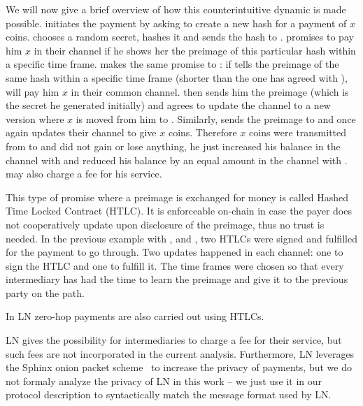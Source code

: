     We will now give a brief overview of how this counterintuitive dynamic
    is made possible. \alice{} initiates the payment by asking \charlie{} to
    create a new hash for a payment of $x$ coins. \charlie{} chooses a random
    secret, hashes it and sends the hash to \alice. \alice{} promises \bob{} to
    pay him $x$ in their channel if he shows her the preimage of this particular
    hash within a specific time frame. \bob{} makes the same promise to
    \charlie{}: if \charlie{} tells \bob{} the preimage of the same hash within
    a specific time frame (shorter than the one \bob{} has agreed with
    \alice{}), \bob{} will pay him $x$ in their common channel. \charlie{} then
    sends him the preimage (which is the secret he generated initially) and
    \bob{} agrees to update the channel to a new version where $x$ is moved from
    him to \charlie. Similarly, \bob{} sends the preimage to \alice{} and once
    again \alice{} updates their channel to give \bob{} $x$ coins. Therefore $x$
    coins were transmitted from \alice{} to \charlie{} and \bob{} did not gain
    or lose anything, he just increased his balance in the channel with \alice{}
    and reduced his balance by an equal amount in the channel with \charlie.
    \bob{} may also charge a fee for his service.

    This type of promise where a preimage is exchanged for money is called
    Hashed Time Locked Contract (HTLC). It is enforceable on-chain in case the
    payer does not cooperatively update upon disclosure of the preimage, thus no
    trust is needed. In the previous example with \alice{}, \bob{} and \charlie,
    two HTLCs were signed and fulfilled for the payment to go through. Two
    updates happened in each channel: one to sign the HTLC and one to fulfill
    it. The time frames were chosen so that every intermediary has had the time
    to learn the preimage and give it to the previous party on the path.

    In LN zero-hop payments are also carried out using HTLCs.

    LN gives the possibility for intermediaries to charge a fee for their
    service, but such fees are not incorporated in the current analysis.
    Furthermore, LN leverages the Sphinx onion packet scheme~\cite{sphinx} to
    increase the privacy of payments, but we do not formaly analyze the privacy
    of LN in this work -- we just use it in our protocol description to
    syntactically match the message format used by LN.
